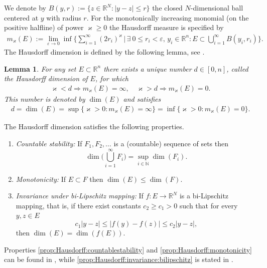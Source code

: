 \documentclass{article}
\numberwithin{equation}{section}
\newcommand{\R}{\mathbb{R}}
\newcommand{\cond}[1]{\, #1 \vert \,}
\theoremstyle{plain}
\newtheorem{lemma}[theorem]{Lemma}
\begin{document}
	We denote by $B(y,r):=\{z\in \R^N:|y-z|\leq r\}$ the closed $N$-dimensional ball centered at $y$ with radius $r$. For the monotonically increasing monomial (on the positive halfline) of power $\varkappa\geq 0 $ the Hausdorff measure is specified by 
	\begin{align*}
		m_\varkappa(E):=\lim\limits_{\varepsilon\to 0} \inf\bigg\{\sum_{i=1}^\infty (2r_i)^\varkappa\cond{\big}\exists\ 0\leq r_i<\varepsilon,\, y_i\in \R^n: E\subset \bigcup\limits_{i=1}^\infty B(y_i,r_i)\bigg\}.
	\end{align*}
	The Hausdorff dimension is defined by the following lemma, see \cite[8.1 Hausdorff dimension]{Adler1981}. 
	\begin{lemma}
		\label{lm:Hausdorff_dimension}
		For any set $E\subset \mathbb{R}^n$ there exists a unique number $d\in[0,n]$, called the Hausdorff dimension of $E$, for which 
		\begin{align*}
			\varkappa <d\Rightarrow m_\varkappa(E)=\infty, \quad \varkappa >d\Rightarrow m_\varkappa(E)=0. 
		\end{align*}
		This number is denoted by $\dim (E)$ and satisfies
		\begin{align*}
			d=\dim(E)=\sup\{\varkappa>0:m_\varkappa(E)=\infty \}=\inf \{\varkappa>0:m_\varkappa(E)=0\}.
		\end{align*}
	\end{lemma}
The Hausdorff dimension satisfies the following properties.
    \begin{enumerate}[label=(H\arabic*), leftmargin=2cm]
		\item \textit{Countable stability:} \label{prop:Hausdorff:countablestability}If $F_1,F_2,\dots $ is a (countable) sequence of sets then $$\dim \Big(\bigcup\limits_{i=1}^\infty F_i\Big)=\sup\limits_{i\in\mathbb{N}}\dim (F_i).$$
		\item\textit{Monotonicity:} \label{prop:Hausdorff:monotonicity} If $E\subset F$ then $\dim (E)\leq \dim (F)$.
        \item\textit{Invariance under bi-Lipschitz mapping:}\label{prop:Hausdorff:invariance:bilipschitz} If $f:E\to \R^N$ is a bi-Lipschitz mapping, that is, if there exist constants $c_2\geq c_1>0$ such that for every $y,z\in E$ 
        $$c_1|y-z|\leq |f(y)-f(z)|\leq c_2|y-z|,$$
        then $\dim(E)=\dim(f(E))$.
	\end{enumerate}
Properties \ref{prop:Hausdorff:countablestability} and \ref{prop:Hausdorff:monotonicity} can be found in \cite[Section 2.2, Hausdorff Dimension]{Falconer2013fractal}, while \ref{prop:Hausdorff:invariance:bilipschitz} is stated in \cite[Corollary 2.4]{Falconer2013fractal}.
\end{document}

